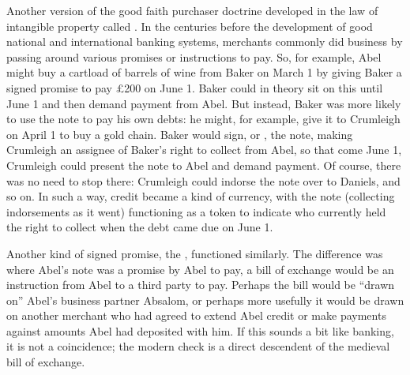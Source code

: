 


Another version of the good faith purchaser doctrine developed in the law of
intangible property called .
In the centuries before
the development of good national and international banking systems, merchants
commonly did business by passing around various promises or instructions to
pay. So, for example, Abel might buy a cartload of barrels of wine from Baker
on March 1 by giving Baker a signed promise to pay {\pounds}200 on June 1.
Baker could in theory sit on this  until June 1 and
then demand payment from Abel. But instead, Baker was more likely to use the
note to pay his own debts: he might, for example, give it to Crumleigh on April
1 to buy a gold chain. Baker would sign, or , the note, making
Crumleigh an assignee of Baker's right to collect from Abel, so that come June
1, Crumleigh could present the note to Abel and demand payment. Of course,
there was no need to stop there: Crumleigh could indorse the note over to
Daniels, and so on. In such a way, credit became a kind of currency, with the
note (collecting indorsements as it went) functioning as a token to indicate
who currently held the right to collect when the debt came due on June 1.

Another kind of signed promise, the , functioned
similarly. The difference was where Abel's note was a promise by Abel to pay, a
bill of exchange would be an instruction from Abel to a third party to pay.
Perhaps the bill would be ``drawn on'' Abel's business partner Absalom, or
perhaps more usefully it would be drawn on another merchant who had agreed to
extend Abel credit or make payments against amounts Abel had deposited with
him. If this sounds a bit like banking, it is not a coincidence; the modern
check is a direct descendent of the medieval bill of exchange.

